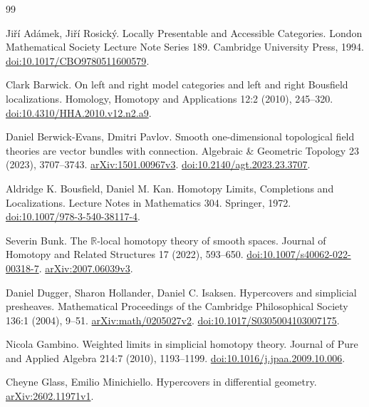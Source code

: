 \documentclass{amsart}
\theoremstyle{definition}
\numberwithin{equation}{subsection}
\numberwithin{subsubsection}{subsection}
\begin{document}
\def\doi#1{\href{https://doi.org/#1}{doi:#1}}
\def\arXiv#1{\href{https://arxiv.org/abs/#1}{arXiv:#1}}
\def\gen#1{\href{http://gen.lib.rus.ec/book/index.php?md5=#1}{PDF}}
\def\jstor#1{\href{https://www.jstor.org/stable/#1}{JSTOR:#1}}
\def\numdam#1{\href{http://www.numdam.org/item/#1}{numdam:#1}}


\begin{thebibliography}{99}

  Ji\v{r}\'i Ad\'amek, Ji\v{r}\'i Rosick\'y.
  Locally Presentable and Accessible Categories.
  London Mathematical Society Lecture Note Series 189.
  Cambridge University Press, 1994.
  \doi{10.1017/CBO9780511600579}.

  Clark Barwick.
  On left and right model categories and left and right Bousfield localizations.
  Homology, Homotopy and Applications 12:2 (2010), 245--320.
  \doi{10.4310/HHA.2010.v12.n2.a9}.

  Daniel Berwick-Evans, Dmitri Pavlov.
  Smooth one-dimensional topological field theories are vector bundles with
  connection.
  Algebraic \& Geometric Topology 23 (2023), 3707--3743.
  \arXiv{1501.00967v3}.
  \doi{10.2140/agt.2023.23.3707}.

  Aldridge K. Bousfield, Daniel M. Kan.
  Homotopy Limits, Completions and Localizations.
  Lecture Notes in Mathematics 304.
  Springer, 1972.
  \doi{10.1007/978-3-540-38117-4}.

  Severin Bunk.
  The \(\mathbb{R}\)-local homotopy theory of smooth spaces.
  Journal of Homotopy and Related Structures 17 (2022), 593--650.
  \doi{10.1007/s40062-022-00318-7}.
  \arXiv{2007.06039v3}.

  Daniel Dugger, Sharon Hollander, Daniel C. Isaksen.
  Hypercovers and simplicial presheaves.
  Mathematical Proceedings of the Cambridge Philosophical Society 136:1 (2004), 9--51.
  \arXiv{math/0205027v2}.
  \doi{10.1017/S0305004103007175}.

  Nicola Gambino.
  Weighted limits in simplicial homotopy theory.
  Journal of Pure and Applied Algebra 214:7 (2010), 1193--1199.
  \doi{10.1016/j.jpaa.2009.10.006}.

  Cheyne Glass, Emilio Minichiello.
  Hypercovers in differential geometry.
  \arXiv{2602.11971v1}.


\end{thebibliography}
\end{document}
